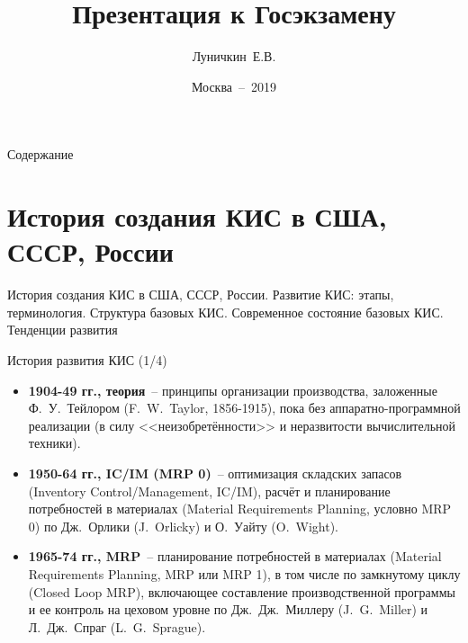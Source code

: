 \documentclass[aspectratio=169]{beamer}
\title{Презентация к Госэкзамену}
\author{Луничкин~Е.В.}
\institute[] %
{
  Московский физико-технический институт (государственный университет)}
\date{Москва~--~2019}
\begin{document}
\begin{frame}
  \titlepage
\end{frame}

\begin{frame}{Содержание}
  \tableofcontents
\end{frame}

\section{История создания КИС в США, СССР, России}

\begin{frame}
\begin{center}
  \Huge{История создания КИС в США, СССР, России. Развитие КИС: этапы,
терминология. Структура базовых КИС. Современное состояние базовых
КИС. Тенденции развития}
\end{center}
\end{frame}

\begin{frame}{История развития КИС (1/4)}
  \begin{itemize}
  \item {
    \textbf{1904-49 гг., теория}~-- принципы организации производства, заложенные Ф.~У.~Тейлором (F.~W.~Taylor, 1856-1915), пока без аппаратно-программной реализации (в силу <<неизобретённости>> и неразвитости вычислительной техники).
  }
  \item {
    \textbf{1950-64 гг., IC/IM (MRP 0)}~-- оптимизация складских запасов (Inventory Control/Management, IC/IM), расчёт и планирование потребностей в материалах (Material Requirements Planning, условно MRP 0) по Дж.~Орлики (J.~Orlicky) и О.~Уайту (O.~Wight).
  }
  \item {
    \textbf{1965-74 гг., MRP}~-- планирование потребностей в материалах (Material Requirements Planning, MRP или MRP 1), в том числе по замкнутому циклу (Closed Loop MRP), включающее составление производственной программы и ее контроль на цеховом уровне по Дж.~Дж.~Миллеру (J.~G.~Miller) и Л.~Дж.~Спраг (L.~G.~Sprague).
  }
  \end{itemize}
\end{frame}
\end{document}

